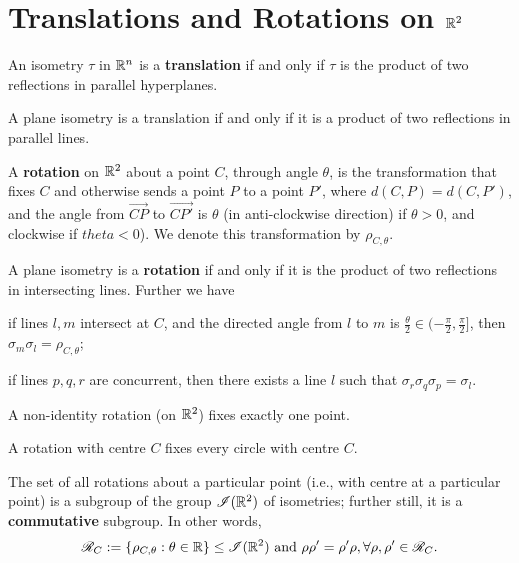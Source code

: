 \section{Translations and Rotations on \(\mathbb{R}^2\)}

\begin{theorem}
    An isometry \(\tau\) in \(\mathbb{R}^n\) is a \textbf{translation} if and only if \(\tau\) is the product of two reflections in parallel hyperplanes.
\end{theorem}

\begin{corollary}
    A plane isometry is a translation if and only if it is a product of two reflections in parallel lines.
\end{corollary}

\begin{definition}
    A \textbf{rotation} on \(\mathbb{R}^2\) about a point \(C\), through angle \(\theta\), is the transformation that fixes \(C\) and otherwise sends a point \(P\) to a point \(P'\), where \(d(C, P) = d(C, P')\), and the angle from \(\vec{CP}\) to \(\vec{CP'}\) is \(\theta\) (in anti-clockwise direction) if \(\theta > 0\), and clockwise if \(theta < 0\)). We denote this transformation by \(\rho_{C, \theta}\).
\end{definition}

\begin{theorem}
    A plane isometry is a \textbf{rotation} if and only if it is the product of two reflections in intersecting lines. Further we have
    \begin{statements}{}
        \item if lines \(l, m\) intersect at \(C\), and the directed angle from \(l\) to \(m\) is \(\frac{\theta}{2} \in (-\frac{\pi}{2}, \frac{\pi}{2}]\), then \(\sigma_m \sigma_l = \rho_{C, \theta}\);
        \item if lines \(p, q, r\) are concurrent, then there exists a line \(l\) such that \(\sigma_r \sigma_q \sigma_p = \sigma_l\).
    \end{statements}
\end{theorem}

\begin{corollary}
    \begin{statements}{}
        \item A non-identity rotation (on \(\mathbb{R}^2\)) fixes exactly one point.
        \item A rotation with centre \(C\) fixes every circle with centre \(C\).
        \item The set of all rotations about a particular point (i.e., with centre at a particular point) is a subgroup of the group \(\mathscr{I}(\mathbb{R}^2)\) of isometries; further still, it is a \textbf{commutative} subgroup. In other words,
        \[\mathscr{R}_C := \{\rho_{C, \theta} : \theta \in \mathbb{R} \} \leq \mathscr{I}(\mathbb{R}^2) \text{ and } \rho\rho' = \rho'\rho, \forall \rho, \rho' \in \mathscr{R}_C.\]
    \end{statements}
\end{corollary}

